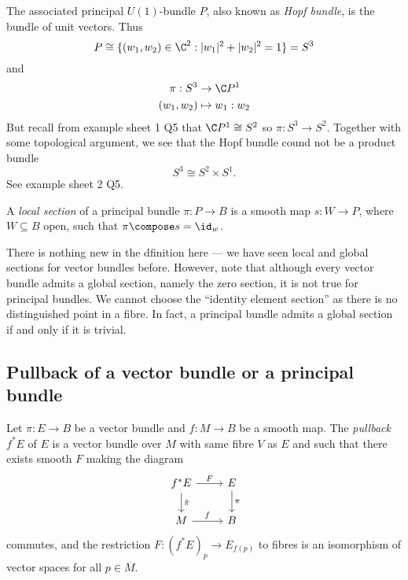 \documentclass[a4paper]{article}
\begin{document}
The associated principal \(U(1)\)-bundle \(P\), also known as \emph{Hopf bundle}, is the bundle of unit vectors. Thus
\[
  P \cong \{(w_1, w_2) \in \C^2: |w_1|^2 + |w_2|^2 = 1\} = S^3
\]
and
\begin{align*}
  \pi: S^3 &\to \C P^1 \\
  (w_1, w_2) &\mapsto w_1 : w_2
\end{align*}
But recall from example sheet 1 Q5 that \(\C P^1 \cong S^2\) so \(\pi: S^3 \to S^2\). Together with some topological argument, we see that the Hopf bundle cound not be a product bundle
\[
  S^3 \cong S^2 \times S^1.
\]
See example sheet 2 Q5.

\begin{definition}
  A \emph{local section} of a principal bundle \(\pi: P \to B\) is a smooth map \(s: W \to P\), where \(W \subseteq B\) open, such that \(\pi \compose s = \id_w\).
\end{definition}

There is nothing new in the dfinition here --- we have seen local and global sections for vector bundles before. However, note that although every vector bundle admits a global section, namely the zero section, it is not true for principal bundles. We cannot choose the ``identity element section'' as there is no distinguished point in a fibre. In fact, a principal bundle admits a global section if and only if it is trivial.

\subsection{Pullback of a vector bundle or a principal bundle}

\begin{definition}
  Let \(\pi: E \to B\) be a vector bundle and \(f: M \to B\) be a smooth map. The \emph{pullback} \(f^*E\) of \(E\) is a vector bundle over \(M\) with same fibre \(V\) as \(E\) and such that there exists smooth \(F\) making the diagram
  \[
    \begin{tikzcd}
      f^*E \ar[r, "F"] \ar[d, "\tilde \pi"] & E \ar[d, "\pi"] \\
      M \ar[r, "f"] & B
    \end{tikzcd}
  \]
  commutes, and the restriction \(F: (f^*E)_p \to E_{f(p)}\) to fibres is an isomorphism of vector spaces for all \(p \in M\).
\end{definition}
\end{document}
